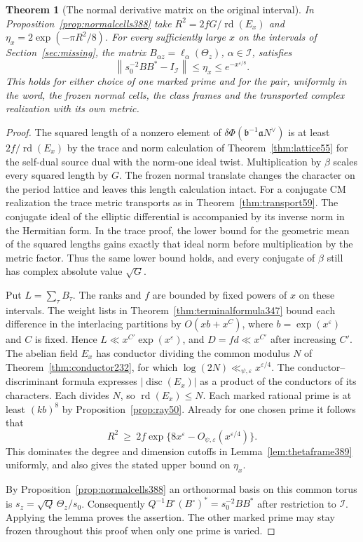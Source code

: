 \documentclass[a4paper,11pt]{article}
\newtheorem{theorem}[proposition]{Theorem}
\theoremstyle{definition}
\theoremstyle{remark}
\numberwithin{equation}{section}
\begin{document}
\begin{theorem}[The normal derivative matrix on the original interval]
\label{thm:normalframe389}
In Proposition~\ref{prop:normalcells388} take
\(R^2=2fG/\operatorname{rd}(E_x)\) and
\(\eta_x=2\exp(-\pi R^2/8)\). For every sufficiently large
\(x\) on the intervals of Section~\ref{sec:missing}, the
matrix \(B_{\alpha z}=\ell_\alpha(\Theta_z)\),
\(\alpha\in\mathcal I\), satisfies
\[
               \left\|s_0^{-2}BB^*-I_{\mathcal I}\right\|
                       \le\eta_x\le e^{-x^{\varepsilon/8}} .
\]
This holds for either choice of one marked prime and for the pair,
uniformly in the word, the frozen normal cells, the class frames
and the transported complex realization with its own metric.
\end{theorem}
\begin{proof}
The squared length of a nonzero element of
\(\delta\Phi(\mathfrak b^{-1}\mathfrak aN^\vee)\) is at least
\(2f/\operatorname{rd}(E_x)\) by the trace and norm calculation
of Theorem~\ref{thm:lattice55} for the self-dual source dual with
the norm-one ideal twist. Multiplication by \(\beta\) scales
every squared length by \(G\). The frozen normal translate
changes the character on the period lattice and leaves this
length calculation intact. For a conjugate CM realization the
trace metric transports as in Theorem~\ref{thm:transport59}.
The conjugate ideal of the elliptic differential is accompanied
by its inverse norm in the Hermitian form. In the trace proof,
the lower bound for the geometric mean of the squared lengths
gains exactly that ideal norm before multiplication by the
metric factor. Thus the same lower bound holds, and every
conjugate of \(\beta\) still has complex absolute value \(\sqrt G\).

Put \(L=\sum_\tau B_\tau\). The ranks and \(f\) are bounded by
fixed powers of \(x\) on these intervals. The weight lists in
Theorem~\ref{thm:terminalformula347} bound each difference in
the interlacing partitions by \(O(xb+x^C)\), where
\(b=\exp(x^\varepsilon)\) and \(C\) is fixed. Hence
\(L\ll x^{C'}\exp(x^\varepsilon)\), and \(D=fd\ll x^{C'}\)
after increasing \(C'\). The abelian field \(E_x\) has conductor
dividing the common modulus \(N\) of Theorem~\ref{thm:conductor232},
for which \(\log(2N)\ll_{\psi,\varepsilon}x^{\varepsilon/4}\).
The conductor--discriminant formula expresses
\(|\operatorname{disc}(E_x)|\) as a product of the conductors
of its characters. Each divides \(N\), so
\(\operatorname{rd}(E_x)\le N\). Each marked rational prime
is at least \((kb)^8\) by Proposition~\ref{prop:ray50}.
Already for one chosen prime it follows that
\[
 R^2\ \ge\ 2f\exp\{8x^\varepsilon-O_{\psi,\varepsilon}
                                    (x^{\varepsilon/4})\}.
\]
This dominates the degree and dimension cutoffs in
Lemma~\ref{lem:thetaframe389} uniformly, and also gives the
stated upper bound on \(\eta_x\).

By Proposition~\ref{prop:normalcells388} an orthonormal basis on
this common torus is \(s_z=\sqrt Q\,\Theta_z/s_0\).
Consequently \(Q^{-1}B^\circ(B^\circ)^*=s_0^{-2}BB^*\)
after restriction to \(\mathcal I\). Applying the lemma proves
the assertion. The other marked prime may stay frozen throughout
this proof when only one prime is varied.
\end{proof}
\end{document}
